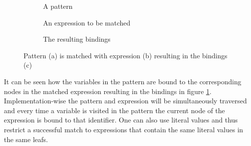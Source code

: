 \begin{figure}[H]
  \centering
  \begin{subfigure}[t]{0.33\textwidth}
    \centering
    \caption{A pattern}
  \end{subfigure}
  \begin{subfigure}[t]{0.32\textwidth}
    \centering
    \caption{An expression to be matched}
  \end{subfigure}
  \begin{subfigure}[t]{0.33\textwidth}
    \centering
    \caption{The resulting bindings}
    \label{subfig:pat-binding}
  \end{subfigure}
  \caption{Pattern (a) is matched with expression (b) resulting in the bindings (c)}
  \label{fig:pattern-match}
\end{figure}

It can be seen how the variables in the pattern are bound to the corresponding nodes in the matched expression resulting in the bindings in figure \ref{subfig:pat-binding}. Implementation-wise the pattern and expression will be simultaneously traversed and every time a variable is visited in the pattern the current node of the expression is bound to that identifier. One can also use literal values and thus restrict a successful match to expressions that contain the same literal values in the same leafs.


